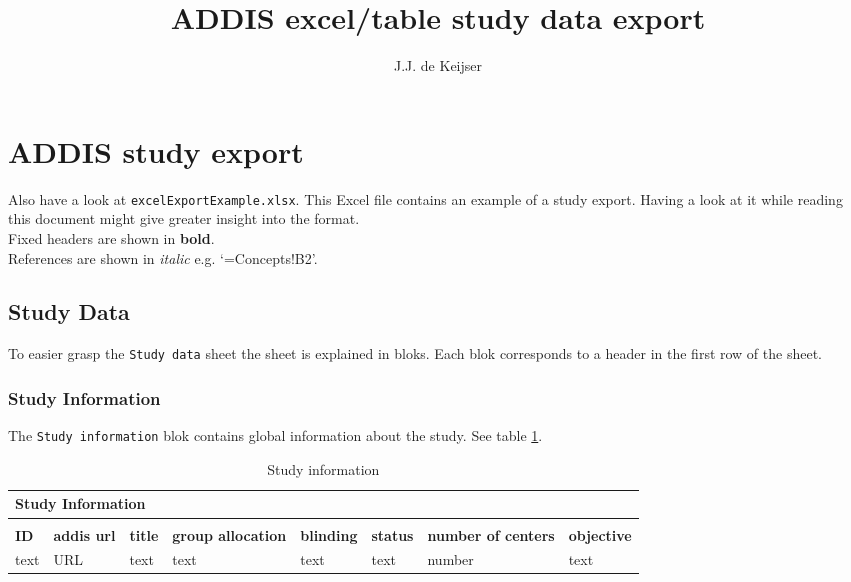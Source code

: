 \documentclass[a4paper,10pt]{article}
\title{ADDIS excel/table study data export}
\author{J.J. de Keijser}
\begin{document}
\maketitle
\section*{ADDIS study export}
Also have a look at \texttt{excelExportExample.xlsx}. This Excel file contains an example of a study export. Having a look at it while reading this document might give greater insight into the format.\\
Fixed headers are shown in \textbf{bold}.\\
References are shown in \textit{italic} e.g. `=Concepts!B2'.

\subsection*{Study Data}
To easier grasp the \texttt{Study data} sheet the sheet is explained in bloks. Each blok corresponds to a header in the first row of the sheet.

\subsubsection*{Study Information}
The \texttt{Study information} blok contains global information about the study. See table \ref{table:Study Information}.
\begin{table}[h]
  \small
  \centering
  \caption{Study information}
  \label{table:Study Information}
  \begin{tabular}{|l|l|l|l|l|l|l|l|}
    \hline
    \multicolumn{8}{|l|}{Study Information} \\ \hline
    \multicolumn{8}{|l|}{}                  \\ \hline
    \textbf{ID} & \textbf{addis url} & \textbf{title} & \textbf{group allocation} & \textbf{blinding} & \textbf{status} & \textbf{number of centers} & \textbf{objective} \\ \hline
    text & URL & text & text & text & text & number & text \\ \hline
  \end{tabular}
\end{table}
\end{document}
